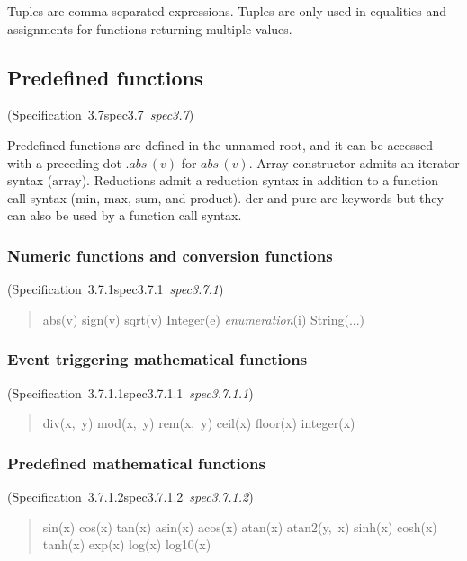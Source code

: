 \documentclass[10pt,b5paper]{article}
\def\specrefx#1#2{Specification~#1\ifx\relax#2\relax{}\else~{\it{}#2}\fi}
\def\specref#1{\specrefx{#1}{\csname spec#1\endcsname}}
\begin{document}
\noindent Tuples are comma separated expressions.  Tuples are only
used in equalities and assignments for functions returning multiple
values.


\subsection{Predefined functions}
(\specref{3.7}\/)

Predefined functions are defined in the unnamed root, and it can be
accessed with a preceding dot $.\mathit{abs}\,(v)$ for
$\mathit{abs}\,(v)$.  Array constructor admits an iterator syntax
($\mathrm{array}$).  Reductions admit a reduction syntax in addition
to a function call syntax ($\mathrm{min}$, $\mathrm{max}$,
$\mathrm{sum}$, and $\mathrm{product}$).  $\mathrm{der}$ and
$\mathrm{pure}$ are keywords but they can also be used by a function
call syntax.

\subsubsection*{Numeric functions and conversion functions}
(\specref{3.7.1}\/)

\begin{quote}\widespacing

abs(v)
sign(v)
sqrt(v)
Integer(e)
{\it{}enumeration}(i)
String(...)

\end{quote}

\subsubsection*{Event triggering mathematical functions}
(\specref{3.7.1.1}\/)

\begin{quote}\widespacing

div(x,~y)
mod(x,~y)
rem(x,~y)
ceil(x)
floor(x)
integer(x)

\end{quote}

\subsubsection*{Predefined mathematical functions}
(\specref{3.7.1.2}\/)

\begin{quote}\widespacing

sin(x)
cos(x)
tan(x)
asin(x)
acos(x)
atan(x)
atan2(y,~x)
sinh(x)
cosh(x)
tanh(x)
exp(x)
log(x)
log10(x)

\end{quote}
\end{document}
